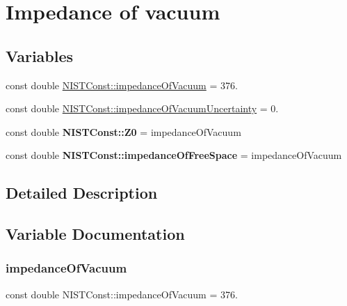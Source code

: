 \hypertarget{group___impedance_of_vacuum}{}\section{Impedance of vacuum}
\label{group___impedance_of_vacuum}
\subsection*{Variables}
\begin{DoxyCompactItemize}
\item 
const double \hyperlink{group___impedance_of_vacuum_ga51e1aede5d89041ea7423522b526dd0e}{N\+I\+S\+T\+Const\+::impedance\+Of\+Vacuum} = 376.
\item 
const double \hyperlink{group___impedance_of_vacuum_ga0d686b0016dc8c1f0bda161283b4f9c5}{N\+I\+S\+T\+Const\+::impedance\+Of\+Vacuum\+Uncertainty} = 0.
\item 
\mbox{\label{group___impedance_of_vacuum_ga0de5c47b3a38d72c61aac5574ea154ca}} 
const double {\bfseries N\+I\+S\+T\+Const\+::\+Z0} = impedance\+Of\+Vacuum
\item 
\mbox{\label{group___impedance_of_vacuum_ga299cd5a5d3a7df43dd6b8c8335bbc8c6}} 
const double {\bfseries N\+I\+S\+T\+Const\+::impedance\+Of\+Free\+Space} = impedance\+Of\+Vacuum
\end{DoxyCompactItemize}


\subsection{Detailed Description}


\subsection{Variable Documentation}
\mbox{\label{group___impedance_of_vacuum_ga51e1aede5d89041ea7423522b526dd0e}} 
\subsubsection{\texorpdfstring{impedance\+Of\+Vacuum}{impedanceOfVacuum}}
{\footnotesize\ttfamily const double N\+I\+S\+T\+Const\+::impedance\+Of\+Vacuum = 376.}


